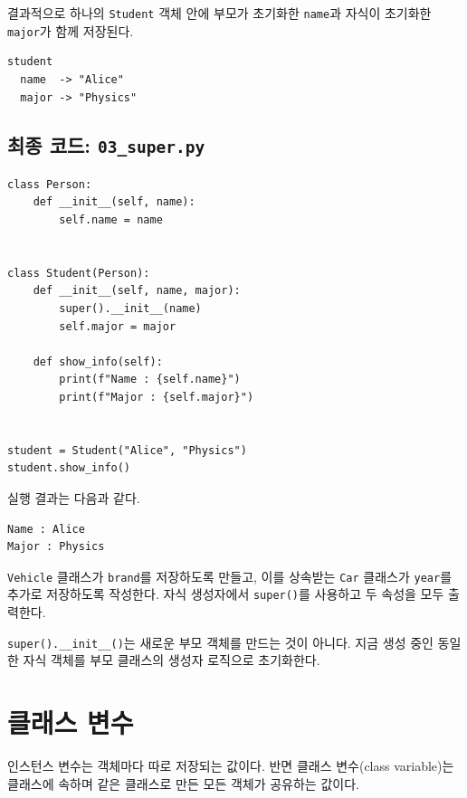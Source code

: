 \documentclass[11pt,a4paper]{article}
\begin{document}
결과적으로 하나의 \texttt{Student} 객체 안에 부모가 초기화한 \texttt{name}과 자식이 초기화한 \texttt{major}가 함께 저장된다.

\begin{verbatim}
student
  name  -> "Alice"
  major -> "Physics"
\end{verbatim}

\subsection{최종 코드: \texttt{03\_super.py}}

\begin{lstlisting}
class Person:
    def __init__(self, name):
        self.name = name


class Student(Person):
    def __init__(self, name, major):
        super().__init__(name)
        self.major = major

    def show_info(self):
        print(f"Name : {self.name}")
        print(f"Major : {self.major}")


student = Student("Alice", "Physics")
student.show_info()
\end{lstlisting}

실행 결과는 다음과 같다.

\begin{verbatim}
Name : Alice
Major : Physics
\end{verbatim}

\begin{practicebox}
\texttt{Vehicle} 클래스가 \texttt{brand}를 저장하도록 만들고, 이를 상속받는 \texttt{Car} 클래스가 \texttt{year}를 추가로 저장하도록 작성한다. 자식 생성자에서 \texttt{super()}를 사용하고 두 속성을 모두 출력한다.
\end{practicebox}

\begin{importantbox}
\texttt{super().\_\_init\_\_()}는 새로운 부모 객체를 만드는 것이 아니다. 지금 생성 중인 동일한 자식 객체를 부모 클래스의 생성자 로직으로 초기화한다.
\end{importantbox}

\section{클래스 변수}

인스턴스 변수는 객체마다 따로 저장되는 값이다. 반면 클래스 변수(class variable)는 클래스에 속하며 같은 클래스로 만든 모든 객체가 공유하는 값이다.
\end{document}
